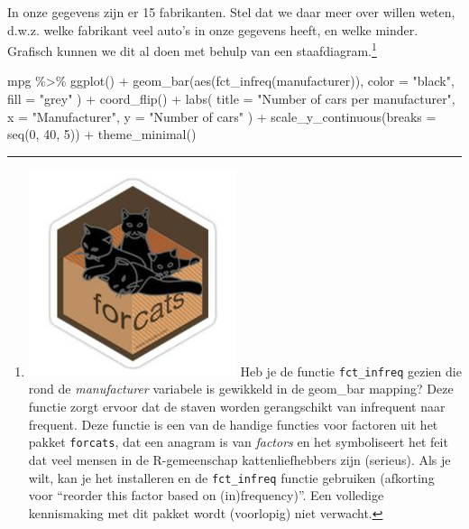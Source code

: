 \documentclass[]{tufte-book}
\newenvironment{Shaded}{}{}
\newcommand{\AttributeTok}[1]{\textcolor[rgb]{0.49,0.56,0.16}{#1}}
\newcommand{\DecValTok}[1]{\textcolor[rgb]{0.25,0.63,0.44}{#1}}
\newcommand{\FunctionTok}[1]{\textcolor[rgb]{0.02,0.16,0.49}{#1}}
\newcommand{\NormalTok}[1]{#1}
\newcommand{\SpecialCharTok}[1]{\textcolor[rgb]{0.25,0.44,0.63}{#1}}
\newcommand{\StringTok}[1]{\textcolor[rgb]{0.25,0.44,0.63}{#1}}
\begin{document}
In onze gegevens zijn er 15 fabrikanten. Stel dat we daar meer over willen weten, d.w.z. welke fabrikant veel auto's in onze gegevens heeft, en welke minder. Grafisch kunnen we dit al doen met behulp van een staafdiagram.\footnote{\includegraphics{images/forcats.jpg} Heb je de functie \texttt{fct\_infreq} gezien die rond de \emph{manufacturer} variabele is gewikkeld in de geom\_bar mapping? Deze functie zorgt ervoor dat de staven worden gerangschikt van infrequent naar frequent. Deze functie is een van de handige functies voor factoren uit het pakket \texttt{forcats}, dat een anagram is van \emph{factors} en het symboliseert het feit dat veel mensen in de R-gemeenschap kattenliefhebbers zijn (serieus). Als je wilt, kan je het installeren en de \texttt{fct\_infreq} functie gebruiken (afkorting voor ``reorder this factor based on (in)frequency)''. Een volledige kennismaking met dit pakket wordt (voorlopig) niet verwacht.}

\begin{Shaded}
\begin{Highlighting}[]
\NormalTok{mpg }\SpecialCharTok{\%\textgreater{}\%}
  \FunctionTok{ggplot}\NormalTok{() }\SpecialCharTok{+}
  \FunctionTok{geom\_bar}\NormalTok{(}\FunctionTok{aes}\NormalTok{(}\FunctionTok{fct\_infreq}\NormalTok{(manufacturer)),}
    \AttributeTok{color =} \StringTok{"black"}\NormalTok{, }\AttributeTok{fill =} \StringTok{"grey"}
\NormalTok{  ) }\SpecialCharTok{+}
  \FunctionTok{coord\_flip}\NormalTok{() }\SpecialCharTok{+}
  \FunctionTok{labs}\NormalTok{(}
    \AttributeTok{title =} \StringTok{"Number of cars per manufacturer"}\NormalTok{,}
    \AttributeTok{x =} \StringTok{"Manufacturer"}\NormalTok{,}
    \AttributeTok{y =} \StringTok{"Number of cars"}
\NormalTok{  ) }\SpecialCharTok{+}
  \FunctionTok{scale\_y\_continuous}\NormalTok{(}\AttributeTok{breaks =} \FunctionTok{seq}\NormalTok{(}\DecValTok{0}\NormalTok{, }\DecValTok{40}\NormalTok{, }\DecValTok{5}\NormalTok{)) }\SpecialCharTok{+}
  \FunctionTok{theme\_minimal}\NormalTok{()}
\end{Highlighting}
\end{Shaded}
\end{document}
